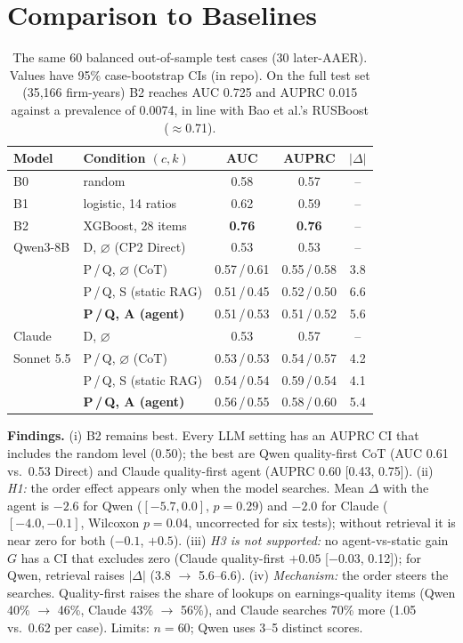\documentclass[9pt,twocolumn,letterpaper]{extarticle}
\begin{document}
\section{Comparison to Baselines}
\begin{table}[H]
\centering\footnotesize\setlength{\tabcolsep}{3.5pt}
\begin{tabular}{llccc}
\toprule
Model & Condition $(c,k)$ & AUC & AUPRC & $|\Delta|$ \\
\midrule
B0 & random & 0.58 & 0.57 & -- \\
B1 & logistic, 14 ratios & 0.62 & 0.59 & -- \\
B2 & XGBoost, 28 items & \textbf{0.76} & \textbf{0.76} & -- \\
\midrule
Qwen3-8B & D, $\varnothing$ (CP2 Direct) & 0.53 & 0.53 & -- \\
 & P\,/\,Q, $\varnothing$ (CoT) & 0.57\,/\,0.61 & 0.55\,/\,0.58 & 3.8 \\
 & P\,/\,Q, S (static RAG) & 0.51\,/\,0.45 & 0.52\,/\,0.50 & 6.6 \\
 & \textbf{P\,/\,Q, A (agent)} & 0.51\,/\,0.53 & 0.51\,/\,0.52 & 5.6 \\
Claude & D, $\varnothing$ & 0.53 & 0.57 & -- \\
Sonnet 5.5 & P\,/\,Q, $\varnothing$ (CoT) & 0.53\,/\,0.53 & 0.54\,/\,0.57 & 4.2 \\
 & P\,/\,Q, S (static RAG) & 0.54\,/\,0.54 & 0.59\,/\,0.54 & 4.1 \\
 & \textbf{P\,/\,Q, A (agent)} & 0.56\,/\,0.55 & 0.58\,/\,0.60 & 5.4 \\
\bottomrule
\end{tabular}
\caption{The same 60 balanced out-of-sample test cases (30 later-AAER). Values have 95\% case-bootstrap CIs (in repo). On the full test set (35,166 firm-years) B2 reaches AUC 0.725 and AUPRC 0.015 against a prevalence of 0.0074, in line with Bao et al.'s RUSBoost ($\approx$0.71).}
\end{table}
\vspace{-6pt}
\noindent\textbf{Findings.} (i) B2 remains best. Every LLM setting has an AUPRC CI that includes the random level (0.50); the best are Qwen quality-first CoT (AUC 0.61 vs.\ 0.53 Direct) and Claude quality-first agent (AUPRC 0.60 [0.43, 0.75]). (ii) \emph{H1:} the order effect appears only when the model searches. Mean $\Delta$ with the agent is $-2.6$ for Qwen ($[-5.7, 0.0]$, $p{=}0.29$) and $-2.0$ for Claude ($[-4.0, -0.1]$, Wilcoxon $p{=}0.04$, uncorrected for six tests); without retrieval it is near zero for both ($-0.1$, $+0.5$). (iii) \emph{H3 is not supported:} no agent-vs-static gain $G$ has a CI that excludes zero (Claude quality-first $+0.05$ [$-0.03$, 0.12]); for Qwen, retrieval raises $|\Delta|$ (3.8 $\to$ 5.6--6.6). (iv) \emph{Mechanism:} the order steers the searches. Quality-first raises the share of lookups on earnings-quality items (Qwen 40\% $\to$ 46\%, Claude 43\% $\to$ 56\%), and Claude searches 70\% more (1.05 vs.\ 0.62 per case). Limits: $n{=}60$; Qwen uses 3--5 distinct scores.
\end{document}
